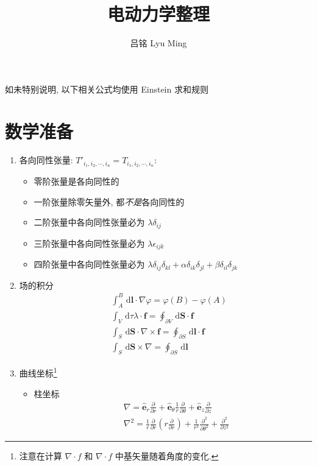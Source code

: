 \documentclass[12pt,a4paper]{article}%
\numberwithin{equation}{section}%
\renewcommand*{\vec}[1]{\bm{#1}}%
\newcommand{\dif}{\,\mathrm d}
\newcommand*{\uvec}[1]{\hat{\vec{#1}}}
\begin{document}
\title{电动力学整理}
\author{吕铭 Lyu Ming}
\maketitle
\tableofcontents

如未特别说明, 以下相关公式均使用 Einstein 求和规则
\section{数学准备} %
\label{sec:math_prep}
\begin{enumerate}
    \item 各向同性张量: $T'_{i_1,i_2,\cdots,i_n} = T_{i_1,i_2,\cdots,i_n}$:
    \begin{itemize}
        \item 零阶张量是各向同性的
        \item 一阶张量除零矢量外, 都\emph{不是}各向同性的
        \item 二阶张量中各向同性张量必为 $\lambda \delta_{ij}$
        \item 三阶张量中各向同性张量必为 $\lambda \epsilon_{ijk}$
        \item 四阶张量中各向同性张量必为 $\lambda\delta_{ij}\delta_{kl} + \alpha\delta_{ik}\delta_{jl} + \beta\delta_{il}\delta_{jk}$
    \end{itemize} 
    \item 场的积分
    \begin{align}
        &\int_A^B\dif\vec l\cdot\nabla\varphi = \varphi(B) - \varphi(A) \\
        &\int_V\dif \tau\lambda\cdot\vec f = \oint_{\partial V}\dif\vec S\cdot\vec f \\
        &\int_S\dif\vec S\cdot\nabla\times\vec f = \oint_{\partial S}\dif\vec l \cdot\vec f \\
        &\int_S\dif \vec S\times\nabla = \oint_{\partial S}\dif\vec l
    \end{align}
    \item 曲线坐标\footnote{注意在计算 $\nabla\cdot f$ 和 $\nabla\cdot f$ 中基矢量随着角度的变化. }
    \begin{itemize}
        \item 柱坐标
        \begin{align}
            &\nabla = \uvec e_r\frac{\partial}{\partial r} + \uvec e_\theta\frac 1r\frac{\partial}{\partial\theta} + \uvec e_z\frac{\partial}{\partial z} \\
            &\nabla^2 = \frac 1r\frac{\partial}{\partial r}\left( r\frac{\partial}{\partial r} \right) + \frac 1{r^2}\frac{\partial^2}{\partial \theta^2} + \frac{\partial^2}{\partial z^2}

\end{align}
\end{itemize}
\end{enumerate}
\end{document}
